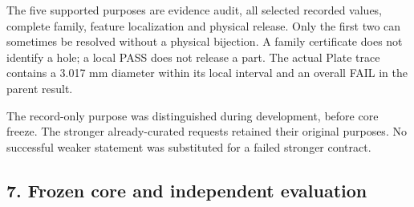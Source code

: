 \documentclass[
  10pt,
]{article}
\let\OriginalSubsection\subsection
\renewcommand{\subsection}{\needspace{6\baselineskip}\OriginalSubsection}
\begin{document}
The five supported purposes are evidence audit, all selected recorded
values, complete family, feature localization and physical release. Only
the first two can sometimes be resolved without a physical bijection. A
family certificate does not identify a hole; a local PASS does not
release a part. The actual Plate trace contains a 3.017 mm diameter
within its local interval and an overall FAIL in the parent result.

The record-only purpose was distinguished during development, before
core freeze. The stronger already-curated requests retained their
original purposes. No successful weaker statement was substituted for a
failed stronger contract.

\hypertarget{frozen-core-and-independent-evaluation}{%
\subsection{7. Frozen core and independent
evaluation}\label{frozen-core-and-independent-evaluation}}
\end{document}
